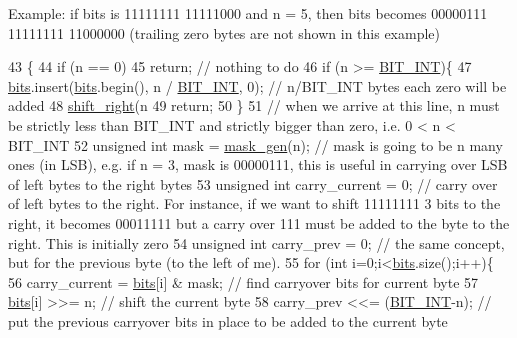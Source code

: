 Example\+: if bits is 11111111 11111000 and n = 5, then bits becomes 00000111 11111111 11000000 (trailing zero bytes are not shown in this example) 
\begin{DoxyCode}
43                                \{
44   \textcolor{keywordflow}{if} (n == 0)
45     \textcolor{keywordflow}{return}; \textcolor{comment}{// nothing to do}
46   \textcolor{keywordflow}{if} (n >= \hyperlink{bitstream_8h_afcadf5aa65c5159bfb96c4d82ebc0a5d}{BIT\_INT})\{
47     \hyperlink{classbit__pipe_a86f38af1e9736b053728033490476b50}{bits}.insert(\hyperlink{classbit__pipe_a86f38af1e9736b053728033490476b50}{bits}.begin(), n / \hyperlink{bitstream_8h_afcadf5aa65c5159bfb96c4d82ebc0a5d}{BIT\_INT}, 0); \textcolor{comment}{// n/BIT\_INT bytes each zero will be added}
48     \hyperlink{classbit__pipe_a341a1f62d728a67f730503ca722a7770}{shift\_right}(n%
49     \textcolor{keywordflow}{return};
50   \}
51   \textcolor{comment}{// when we arrive at this line, n must be strictly less than BIT\_INT and strictly bigger than zero, i.e.
       0 < n < BIT\_INT}
52   \textcolor{keywordtype}{unsigned} \textcolor{keywordtype}{int} mask = \hyperlink{bitstream_8cpp_a6364b017a9400a38f7a994376bb3ebee}{mask\_gen}(n); \textcolor{comment}{// mask is going to be n many ones (in LSB), e.g. if n = 3, mask
       is 00000111, this is useful in carrying over LSB of left bytes to the right bytes}
53   \textcolor{keywordtype}{unsigned} \textcolor{keywordtype}{int} carry\_current = 0; \textcolor{comment}{// carry over of left bytes to the right. For instance, if we want to
       shift 11111111 3 bits to the right, it becomes 00011111 but a carry over 111 must be added to the byte to the
       right. This is initially zero}
54   \textcolor{keywordtype}{unsigned} \textcolor{keywordtype}{int} carry\_prev = 0; \textcolor{comment}{// the same concept, but for the previous byte (to the left of me). }
55   \textcolor{keywordflow}{for} (\textcolor{keywordtype}{int} i=0;i<\hyperlink{classbit__pipe_a86f38af1e9736b053728033490476b50}{bits}.size();i++)\{
56     carry\_current = \hyperlink{classbit__pipe_a86f38af1e9736b053728033490476b50}{bits}[i] & mask; \textcolor{comment}{// find carryover bits for current byte}
57     \hyperlink{classbit__pipe_a86f38af1e9736b053728033490476b50}{bits}[i] >>= n; \textcolor{comment}{// shift the current byte}
58     carry\_prev <<= (\hyperlink{bitstream_8h_afcadf5aa65c5159bfb96c4d82ebc0a5d}{BIT\_INT}-n); \textcolor{comment}{// put the previous carryover bits in place to be added to the
       current byte}

\end{DoxyCode}
